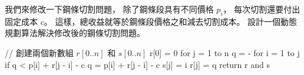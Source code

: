 \startEXERCISE
我們來修改一下鋼條切割問題，
除了鋼條段具有不同價格 $p_i$，
每次切割還要付出固定成本 $c$。
這樣，總收益就等於鋼條段價格之和減去切割成本。
設計一個動態規劃算法解決修改後的鋼條切割問題。
\stopEXERCISE

\startANSWER
{}
\startCLRSCODE
// 創建兩個新數組 $r[0..n]$ 和 $s[0..n]$
r[0] = 0
for j = 1 to n
	q = -\infty
	for i = 1 to j
		if q < p[i] + r[j - i] - c
			q = p[i] + r[j - i] - c
			s[j] = i
	r[j] = q
return r and s
\stopCLRSCODE
\stopANSWER
